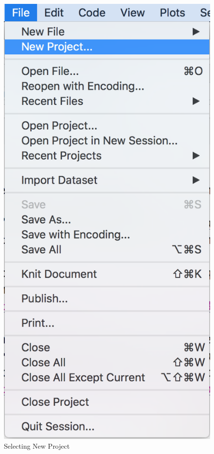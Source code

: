 \documentclass[
]{book}
\begin{document}
\begin{figure}
\includegraphics[width=7.25in]{images/rstudio.file.newproject} \caption{Selecting New Project}\label{fig:filenew-drop}
\end{figure}
\end{document}
